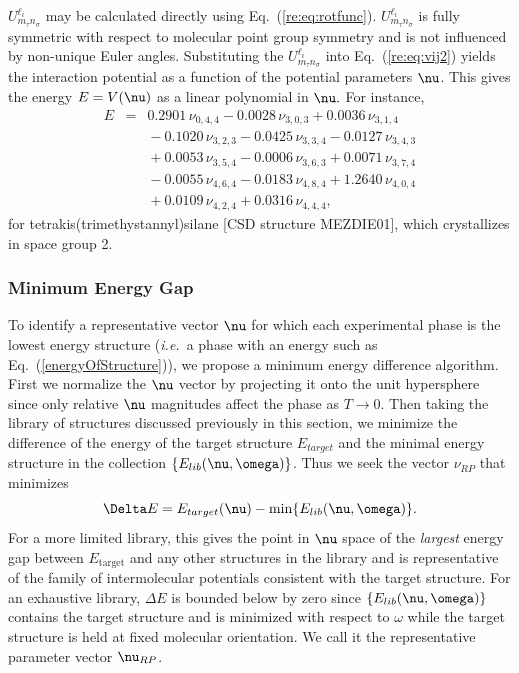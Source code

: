 \documentclass[preprint]{iucr}              %
\newcommand{\mb}[1]{\ensuremath{\mbox{\boldmath $ #1 $}}}
\begin{document}
$U^{\ell_i}_{m_\tau n_\sigma}$ may be calculated directly using
Eq.~(\ref{re:eq:rotfunc}).  $U^{\ell_i}_{m_\tau n_\sigma}$ is fully symmetric
with
respect to molecular point group symmetry and is not influenced by non-unique
Euler angles. Substituting the $U^{\ell_i}_{m_\tau n_\sigma}$ into
Eq.~(\ref{re:eq:vij2}) yields the interaction potential as a function
of the potential parameters $\mb{\nu}$. This gives the energy
$E=V(\mb{\nu})$ as a linear polynomial in $\mb{\nu}.$   For instance,
\begin{eqnarray}
\label{energyOfStructure} E & = & 0.2901\,\nu_{0,4,4} -
0.0028\,\nu_{3,0,3} +
0.0036\,\nu_{3,1,4}  \nonumber \\
&&{}- 0.1020\,\nu_{3,2,3} - 0.0425\,\nu_{3,3,4} -0.0127\,\nu_{3,4,3}
 \nonumber \\
&&{}+ 0.0053\,\nu_{3,5,4} - 0.0006\,\nu_{3,6,3} +
0.0071\,\nu_{3,7,4}  \nonumber \\
&&{}- 0.0055\,\nu_{4,6,4} - 0.0183\,\nu_{4,8,4}+
1.2640\,\nu_{4,0,4}\nonumber\\
&&{}+ 0.0109\,\nu_{4,2,4} + 0.0316\,\nu_{4,4,4},
\end{eqnarray}
for tetrakis(trimethystannyl)silane  [CSD structure MEZDIE01], which
crystallizes in space group 2.

\subsubsection{Minimum Energy Gap}
\label{Minimum_Energy_Gap}

To identify a representative vector $\mb{\nu}$ for which each
experimental phase is the lowest energy structure (\emph{i.e.}\ a
phase with an energy such as Eq.\ (\ref{energyOfStructure})), we
propose a minimum energy difference algorithm. First we normalize the
$\mb{\nu}$ vector by projecting it onto the unit hypersphere since only relative
$\mb{\nu}$ magnitudes affect the phase as $T\rightarrow 0$. Then
taking the library of structures discussed previously in this
section, we minimize the difference of the energy of the target
structure $E_{target}$ and the minimal energy structure in the
collection $\{E_{lib}(\mb{\nu},\mb{\omega})\}$.  Thus we seek the
vector $\nu_{RP}$ that minimizes
\begin{equation}
\label{Endiff} \Delta E =
E_{target}(\mb{\nu})-\min\{E_{lib}(\mb{\nu},\mb{\omega})\}.
\end{equation}
For a more limited library, this gives the point in $\mb{\nu}$ space of the
\emph{largest}
energy gap between $E_{\mathrm{target}}$ and any other structures in
the library and is representative of the family of intermolecular
potentials consistent with the target structure. For an exhaustive
library, $\Delta E$ is bounded below by zero since
$\{E_{lib}(\mb{\nu},\mb{\omega})\}$ contains the target structure
and is minimized with respect to $\omega$ while the target structure
is held at fixed molecular orientation. We call it the
representative parameter vector $\mb{\nu}_{RP}$.
\end{document}
